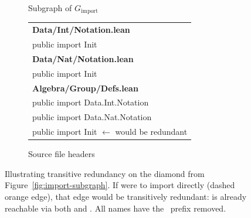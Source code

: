 \begin{figure}[H]
\centering
\begin{subfigure}[t]{0.42\textwidth}
\centering
\vspace{0pt}
\caption{Subgraph of $G_{\mathrm{import}}$}
\label{fig:tr-graph}
\end{subfigure}%
\hfill
\begin{subfigure}[t]{0.46\textwidth}
\vspace{0pt}\raggedleft
\scriptsize\ttfamily
\begin{tabular}[t]{@{}l@{}}
  \textnormal{\sffamily\bfseries\color{blue!60!black} Data/Int/Notation.lean} \\[1pt]
  \hspace{1em}public import \textcolor{blue!60!black}{Init} \\[6pt]
  \textnormal{\sffamily\bfseries\color{blue!60!black} Data/Nat/Notation.lean} \\[1pt]
  \hspace{1em}public import \textcolor{blue!60!black}{Init} \\[6pt]
  \textnormal{\sffamily\bfseries\color{blue!60!black} Algebra/Group/Defs.lean} \\[1pt]
  \hspace{1em}public import \textcolor{blue!60!black}{Data.Int.Notation} \\
  \hspace{1em}public import \textcolor{blue!60!black}{Data.Nat.Notation} \\
  \hspace{1em}\textcolor{orange!80!red}{public import \textcolor{blue!60!black}{Init}}
    \textnormal{\sffamily\color{orange!80!red} $\leftarrow$ would be redundant} \\
\end{tabular}
\caption{Source file headers}
\label{fig:tr-source}
\end{subfigure}
\caption{Illustrating transitive redundancy on the diamond from Figure~\ref{fig:import-subgraph}. If  were to import  directly (\textcolor{orange!80!red}{dashed orange} edge), that edge would be transitively redundant:  is already reachable via both  and . All names have the \ prefix removed.}
\label{fig:transitive-reduction}
\end{figure}

